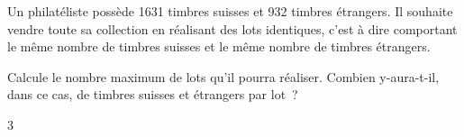 \documentclass[a4paper,11pt]{report}
\begin{document}
\begin{exo}{ %
    Un philatéliste possède 1631 timbres suisses et 932 timbres étrangers. Il souhaite vendre toute sa collection en réalisant des lots identiques, c'est à dire comportant le même nombre de timbres suisses et le même nombre de timbres étrangers.
    \begin{tasks}[label-width = 1em ,item-indent = 2em ,before-skip = -0.4em, after-skip = -0.4em , label-offset=0.666em,after-item-skip = 0.3em]
        \task Calcule le nombre maximum de lots qu'il pourra réaliser.
        \task Combien y-aura-t-il, dans ce cas, de timbres suisses et étrangers par lot~?
    \end{tasks}
}{3}\end{exo}
\end{document}
